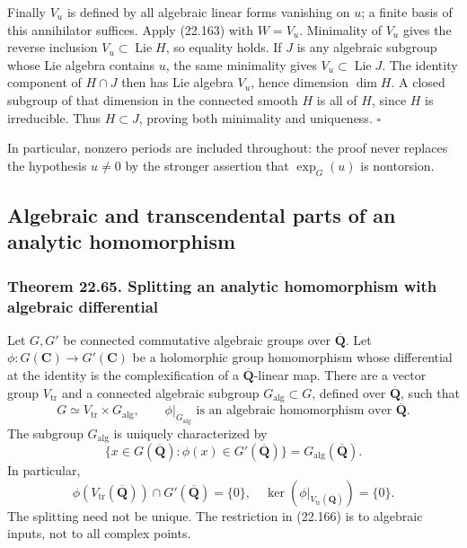 \documentclass[
  11pt,
  a4paper,
]{article}
\begin{document}
Finally \(V_u\) is defined by all algebraic linear forms vanishing on
\(u\); a finite basis of this annihilator suffices. Apply (22.163) with
\(W=V_u\). Minimality of \(V_u\) gives the reverse inclusion
\(V_u\subset\operatorname{Lie}H\), so equality holds. If \(J\) is any
algebraic subgroup whose Lie algebra contains \(u\), the same minimality
gives \(V_u\subset\operatorname{Lie}J\). The identity component of
\(H\cap J\) then has Lie algebra \(V_u\), hence dimension \(\dim H\). A
closed subgroup of that dimension in the connected smooth \(H\) is all
of \(H\), since \(H\) is irreducible. Thus \(H\subset J\), proving both
minimality and uniqueness. \(\square\)

In particular, nonzero periods are included throughout: the proof never
replaces the hypothesis \(u\ne0\) by the stronger assertion that
\(\exp_G(u)\) is nontorsion.

\subsection{Algebraic and transcendental parts of an analytic
homomorphism}\label{algebraic-and-transcendental-parts-of-an-analytic-homomorphism}

\subsubsection{Theorem 22.65. Splitting an analytic homomorphism with
algebraic
differential}\label{theorem-22.65.-splitting-an-analytic-homomorphism-with-algebraic-differential}

Let \(G,G'\) be connected commutative algebraic groups over
\(\overline{\mathbf Q}\). Let \(\phi:G(\mathbf C)\to G'(\mathbf C)\) be
a holomorphic group homomorphism whose differential at the identity is
the complexification of a \(\overline{\mathbf Q}\)-linear map. There are
a vector group \(V_{\mathrm{tr}}\) and a connected algebraic subgroup
\(G_{\mathrm{alg}}\subset G\), defined over \(\overline{\mathbf Q}\),
such that \[
 G\simeq V_{\mathrm{tr}}\times G_{\mathrm{alg}},
 \qquad
 \phi|_{G_{\mathrm{alg}}}\text{ is an algebraic homomorphism over }\overline{\mathbf Q}.
 \tag{22.164}
\] The subgroup \(G_{\mathrm{alg}}\) is uniquely characterized by \[
 \{x\in G(\overline{\mathbf Q}):\phi(x)\in G'(\overline{\mathbf Q})\}
       =G_{\mathrm{alg}}(\overline{\mathbf Q}).
 \tag{22.165}
\] In particular, \[
 \phi(V_{\mathrm{tr}}(\overline{\mathbf Q}))
       \cap G'(\overline{\mathbf Q})=\{0\},
 \quad
 \ker(\phi|_{V_{\mathrm{tr}}(\overline{\mathbf Q})})=\{0\}.
 \tag{22.166}
\] The splitting need not be unique. The restriction in (22.166) is to
algebraic inputs, not to all complex points.
\end{document}
